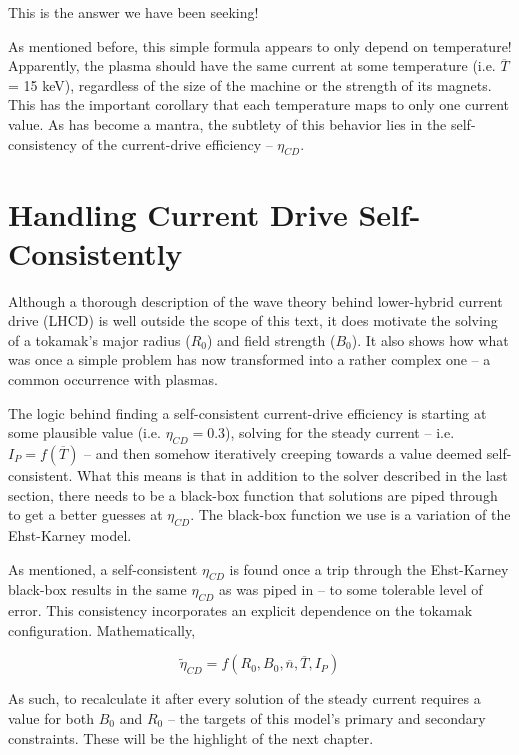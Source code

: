 This is the answer we have been seeking!

As mentioned before, this simple formula appears to only depend on temperature! Apparently, the plasma should have the same current at some temperature (i.e. $\overline T$ = 15 keV), regardless of the size of the machine or the strength of its magnets. This has the important corollary that each temperature maps to only one current value. As has become a mantra, the subtlety of this behavior lies in the self-consistency of the current-drive efficiency -- $\eta_{CD}$.

\section{Handling Current Drive Self-Consistently}

Although a thorough description of the wave theory behind lower-hybrid current drive (LHCD) is well outside the scope of this text, it does motivate the solving of a tokamak's major radius ($R_0$) and field strength ($B_0$). It also shows how what was once a simple problem has now transformed into a rather complex one -- a common occurrence with plasmas.

The logic behind finding a self-consistent current-drive efficiency is starting at some plausible value (i.e. $\eta_{CD} = 0.3$), solving for the steady current -- i.e. $I_P = f(\overline T)$ -- and then somehow iteratively creeping towards a value deemed self-consistent. What this means is that in addition to the solver described in the last section, there needs to be a black-box function that solutions are piped through to get a better guesses at $\eta_{CD}$. The black-box function we use is a variation of the Ehst-Karney model. \cite{ehstkarney}

As mentioned, a self-consistent $\eta_{CD}$ is found once a trip through the Ehst-Karney black-box results in the same $\eta_{CD}$ as was piped in -- to some tolerable level of error. This consistency incorporates an explicit dependence on the tokamak configuration. Mathematically,

\begin{equation}
	\tilde \eta_{CD} = f( R_0, B_0, \overline n, \overline T, I_P )
\end{equation}

As such, to recalculate it after every solution of the steady current requires a value for both $B_0$ and $R_0$ -- the targets of this model's primary and secondary constraints. These will be the highlight of the next chapter.

%
